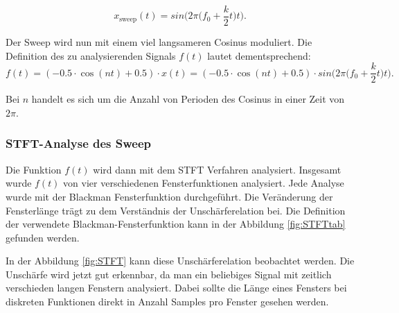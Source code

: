 \[
x_{\text{sweep}}(t) = sin \biggl( 2\pi \biggl(f_0 +\frac{k}2t\biggr) t \biggr).
\]

Der Sweep wird nun mit einem viel langsameren Cosinus moduliert. Die Definition des zu analysierenden Signals $f(t)$ lautet dementsprechend:
\[
f(t)= (-0.5\cdot \cos(nt)+0.5)\cdot x(t)=(-0.5\cdot \cos(nt)+0.5)\cdot sin \biggl( 2\pi \biggl(f_0 +\frac{k}2t\biggr) t \biggr).
\] \label{eq:sin-sweep}

Bei $n$ handelt es sich um die Anzahl von Perioden des Cosinus in einer Zeit von $2\pi$.

\subsubsection{STFT-Analyse des Sweep}
Die Funktion $f(t)$  wird dann mit dem STFT Verfahren analysiert. Insgesamt wurde $f(t)$ von vier verschiedenen Fensterfunktionen analysiert. Jede Analyse wurde mit der Blackman Fensterfunktion durchgeführt. Die Veränderung der Fensterlänge trägt zu dem Verständnis der Unschärferelation bei. Die Definition der verwendete Blackman-Fensterfunktion kann in der Abbildung \ref{fig:STFTtab} gefunden werden.


In der Abbildung \ref{fig:STFT} kann diese Unschärferelation beobachtet werden. Die Unschärfe wird jetzt gut erkennbar, da man ein beliebiges Signal mit zeitlich verschieden langen Fenstern analysiert. Dabei sollte die Länge eines Fensters bei diskreten Funktionen direkt in Anzahl Samples pro Fenster gesehen werden.



